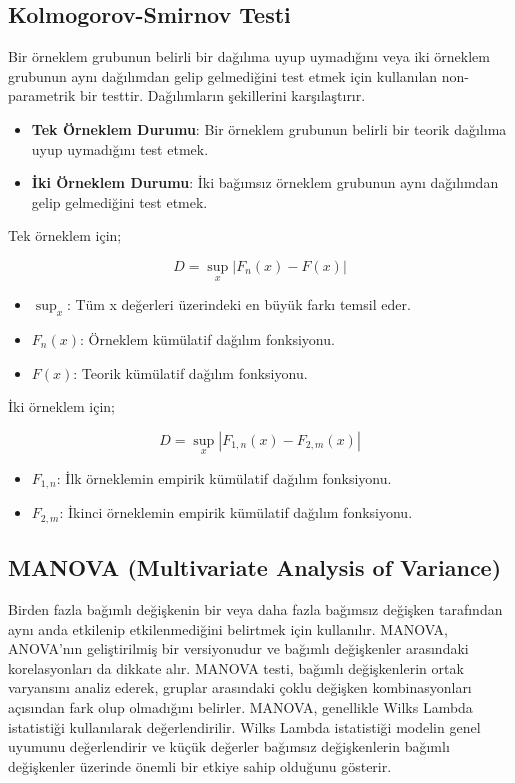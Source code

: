 \newpage

\subsection{Kolmogorov-Smirnov Testi}
Bir örneklem grubunun belirli bir dağılıma uyup uymadığını veya iki örneklem grubunun aynı dağılımdan gelip gelmediğini test etmek için kullanılan non-parametrik bir testtir. Dağılımların şekillerini karşılaştırır.

\begin{itemize}
	\item \textbf{Tek Örneklem Durumu}: Bir örneklem grubunun belirli bir teorik dağılıma uyup uymadığını test etmek.
	\item \textbf{İki Örneklem Durumu}: İki bağımsız örneklem grubunun aynı dağılımdan gelip gelmediğini test etmek.
\end{itemize}

Tek örneklem için;

\[ D = \sup_x | F_n(x) - F(x) | \]

\begin{itemize}
	\item $\sup_x$: Tüm x değerleri üzerindeki en büyük farkı temsil eder.
	\item $F_n(x)$: Örneklem kümülatif dağılım fonksiyonu.
	\item $F(x)$: Teorik kümülatif dağılım fonksiyonu.
\end{itemize}

İki örneklem için;

\[ D = \sup_x | F_{1,n}(x) - F_{2,m}(x) | \]

\begin{itemize}
	\item $F_{1,n}$: İlk örneklemin empirik kümülatif dağılım fonksiyonu.
	\item $F_{2,m}$: İkinci örneklemin empirik kümülatif dağılım fonksiyonu.
\end{itemize}

\newpage

\subsection{MANOVA (Multivariate Analysis of Variance)}
Birden fazla bağımlı değişkenin bir veya daha fazla bağımsız değişken tarafından aynı anda etkilenip etkilenmediğini belirtmek için kullanılır. MANOVA, ANOVA'nın geliştirilmiş bir versiyonudur ve bağımlı değişkenler arasındaki korelasyonları da dikkate alır. MANOVA testi, bağımlı değişkenlerin ortak varyansını analiz ederek, gruplar arasındaki çoklu değişken kombinasyonları açısından fark olup olmadığını belirler. MANOVA, genellikle Wilks Lambda istatistiği kullanılarak değerlendirilir. Wilks Lambda istatistiği modelin genel uyumunu değerlendirir ve küçük değerler bağımsız değişkenlerin bağımlı değişkenler üzerinde önemli bir etkiye sahip olduğunu gösterir.

